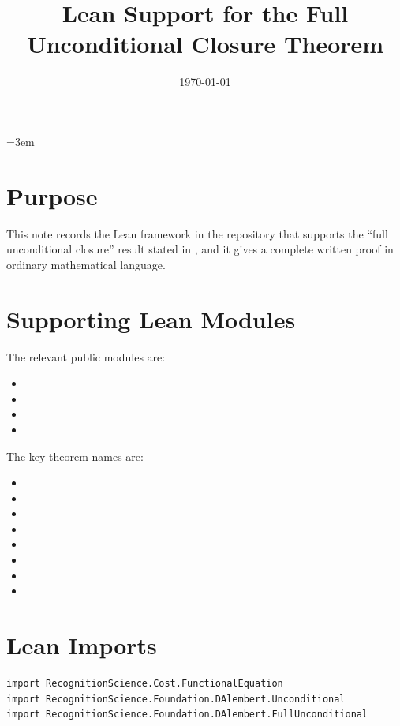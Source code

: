 \documentclass[11pt]{article}
\title{Lean Support for the Full Unconditional Closure Theorem}
\author{}
\date{\today}
\theoremstyle{plain}
\begin{document}
\maketitle
\emergencystretch=3em

\section*{Purpose}
This note records the Lean framework in the repository that supports the
``full unconditional closure'' result stated in
, and it gives a complete
written proof in ordinary mathematical language.

\section*{Supporting Lean Modules}
The relevant public modules are:
\begin{itemize}[nosep]
\item {}
\item {}
\item {}
\item {}
\end{itemize}

The key theorem names are:
\begin{itemize}[nosep]
\item {}
\item {}
\item {}
\item {}
\item {}
\item {}
\item {}
\item {}
\end{itemize}

\section*{Lean Imports}
\begin{lstlisting}[style=lean]
import RecognitionScience.Cost.FunctionalEquation
import RecognitionScience.Foundation.DAlembert.Unconditional
import RecognitionScience.Foundation.DAlembert.FullUnconditional
\end{lstlisting}
\end{document}
